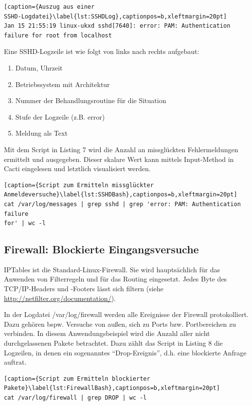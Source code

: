 \documentclass[12pt,ngerman,toc=listofnumbered,toc=bibliographynumbered,toc=index,headsepline=true]{scrbook}
\begin{document}
\begin{lstlisting}[caption={Auszug aus einer
SSHD-Logdatei}\label{lst:SSHDLog},captionpos=b,xleftmargin=20pt]
Jan 15 21:55:19 linux-ukxd sshd[7640]: error: PAM: Authentication failure for root from localhost
\end{lstlisting}

Eine SSHD-Logzeile ist wie folgt von links nach rechts aufgebaut:
\begin{enumerate}
  \item Datum, Uhrzeit
  \item Betriebssystem mit Architektur
  \item Nummer der Behandlungsroutine für die Situation
  \item Stufe der Logzeile (z.B. error)
  \item Meldung als Text
\end{enumerate}

Mit dem Script in Listing 7 wird die Anzahl an missglückten
Fehlermeldungen ermittelt und ausgegeben. Dieser skalare Wert kann mittels
Input-Method in Cacti eingelesen und letztlich visualisiert werden.

\begin{lstlisting}[caption={Script zum Ermitteln missglückter
Anmeldeversuche}\label{lst:SSHDBash},captionpos=b,xleftmargin=20pt]
cat /var/log/messages | grep sshd | grep 'error: PAM: Authentication failure
for' | wc -l
\end{lstlisting}

\subsection{Firewall: Blockierte Eingangsversuche}
IPTables ist die Standard-Linux-Firewall. Sie wird hauptsächlich für das
Anwenden von Filterregeln und für das Routing eingesetzt. Jedes Byte des
TCP/IP-Headers und -Footers lässt sich filtern (siehe \\
\url{http://netfilter.org/documentation/}).

In der Logdatei /var/log/firewall werden alle Ereignisse der Firewall
protokolliert. Dazu gehören bspw. Versuche von außen, sich zu Ports bzw.
Portbereichen zu verbinden. In diesem Anwendungsbeispiel wird die Anzahl aller
nicht durchgelassenen Pakete betrachtet. Dazu zählt das Script in Listing
8 die Logzeilen, in denen ein sogenanntes
\enquote{Drop-Ereignis}, d.h. eine blockierte Anfrage auftrat.

\begin{lstlisting}[caption={Script zum Ermitteln blockierter
Pakete}\label{lst:FirewallBash},captionpos=b,xleftmargin=20pt]
cat /var/log/firewall | grep DROP | wc -l
\end{lstlisting}
\end{document}
